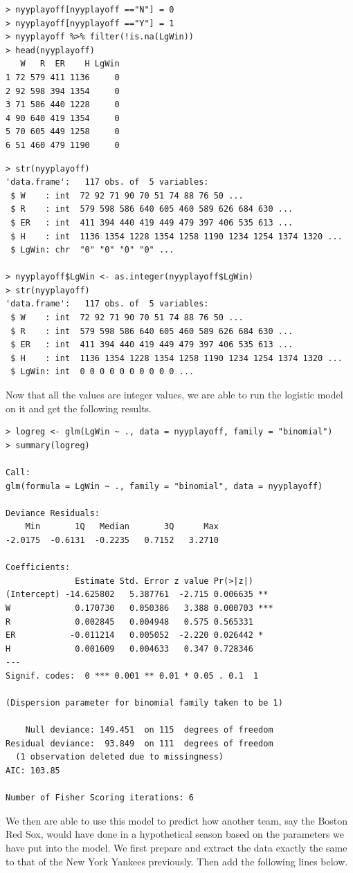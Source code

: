 \documentclass[11pt,a4paper]{report}
\begin{document}
\begin{lstlisting}[basicstyle=\scriptsize]
> nyyplayoff[nyyplayoff =="N"] = 0
> nyyplayoff[nyyplayoff =="Y"] = 1
> nyyplayoff %>% filter(!is.na(LgWin))
> head(nyyplayoff)
   W   R  ER    H LgWin
1 72 579 411 1136     0
2 92 598 394 1354     0
3 71 586 440 1228     0
4 90 640 419 1354     0
5 70 605 449 1258     0
6 51 460 479 1190     0
\end{lstlisting}

\begin{lstlisting}[basicstyle=\scriptsize]
> str(nyyplayoff)
'data.frame':	117 obs. of  5 variables:
 $ W    : int  72 92 71 90 70 51 74 88 76 50 ...
 $ R    : int  579 598 586 640 605 460 589 626 684 630 ...
 $ ER   : int  411 394 440 419 449 479 397 406 535 613 ...
 $ H    : int  1136 1354 1228 1354 1258 1190 1234 1254 1374 1320 ...
 $ LgWin: chr  "0" "0" "0" "0" ...
 
> nyyplayoff$LgWin <- as.integer(nyyplayoff$LgWin)
> str(nyyplayoff)
'data.frame':	117 obs. of  5 variables:
 $ W    : int  72 92 71 90 70 51 74 88 76 50 ...
 $ R    : int  579 598 586 640 605 460 589 626 684 630 ...
 $ ER   : int  411 394 440 419 449 479 397 406 535 613 ...
 $ H    : int  1136 1354 1228 1354 1258 1190 1234 1254 1374 1320 ...
 $ LgWin: int  0 0 0 0 0 0 0 0 0 0 ...
\end{lstlisting}
Now that all the values are integer values, we are able to run the logistic model on it and get the following results.

\begin{lstlisting}[basicstyle=\scriptsize]
> logreg <- glm(LgWin ~ ., data = nyyplayoff, family = "binomial")
> summary(logreg)

Call:
glm(formula = LgWin ~ ., family = "binomial", data = nyyplayoff)

Deviance Residuals: 
    Min       1Q   Median       3Q      Max  
-2.0175  -0.6131  -0.2235   0.7152   3.2710  

Coefficients:
              Estimate Std. Error z value Pr(>|z|)    
(Intercept) -14.625802   5.387761  -2.715 0.006635 ** 
W             0.170730   0.050386   3.388 0.000703 ***
R             0.002845   0.004948   0.575 0.565331    
ER           -0.011214   0.005052  -2.220 0.026442 *  
H             0.001609   0.004633   0.347 0.728346    
---
Signif. codes:  0 *** 0.001 ** 0.01 * 0.05 . 0.1  1

(Dispersion parameter for binomial family taken to be 1)

    Null deviance: 149.451  on 115  degrees of freedom
Residual deviance:  93.849  on 111  degrees of freedom
  (1 observation deleted due to missingness)
AIC: 103.85

Number of Fisher Scoring iterations: 6

\end{lstlisting}
We then are able to use this model to predict how another team, say the Boston Red Sox, would have done in a hypothetical season based on the parameters we have put into the model. We first prepare and extract the data exactly the same to that of the New York Yankees previously. Then add the following lines below.
\end{document}
